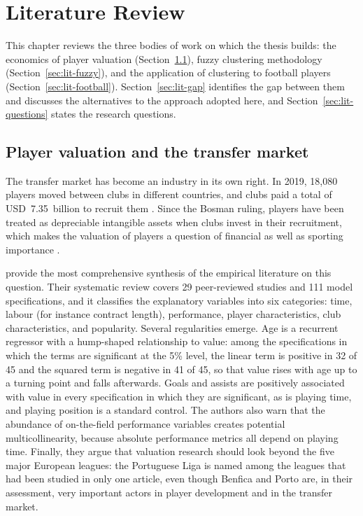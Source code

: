 \chapter{Literature Review}
\label{ch:literature}

This chapter reviews the three bodies of work on which the thesis builds: the economics of player valuation (Section~\ref{sec:lit-valuation}), fuzzy clustering methodology (Section~\ref{sec:lit-fuzzy}), and the application of clustering to football players (Section~\ref{sec:lit-football}). Section~\ref{sec:lit-gap} identifies the gap between them and discusses the alternatives to the approach adopted here, and Section~\ref{sec:lit-questions} states the research questions.

\section{Player valuation and the transfer market}
\label{sec:lit-valuation}

The transfer market has become an industry in its own right. In 2019, 18,080 players moved between clubs in different countries, and clubs paid a total of USD~7.35~billion to recruit them \cite{franceschi2024determinants}. Since the Bosman ruling, players have been treated as depreciable intangible assets when clubs invest in their recruitment, which makes the valuation of players a question of financial as well as sporting importance \cite{franceschi2024determinants}.

 provide the most comprehensive synthesis of the empirical literature on this question. Their systematic review covers 29 peer-reviewed studies and 111 model specifications, and it classifies the explanatory variables into six categories: time, labour (for instance contract length), performance, player characteristics, club characteristics, and popularity. Several regularities emerge. Age is a recurrent regressor with a hump-shaped relationship to value: among the specifications in which the terms are significant at the 5\% level, the linear term is positive in 32 of 45 and the squared term is negative in 41 of 45, so that value rises with age up to a turning point and falls afterwards. Goals and assists are positively associated with value in every specification in which they are significant, as is playing time, and playing position is a standard control. The authors also warn that the abundance of on-the-field performance variables creates potential multicollinearity, because absolute performance metrics all depend on playing time. Finally, they argue that valuation research should look beyond the five major European leagues: the Portuguese Liga is named among the leagues that had been studied in only one article, even though Benfica and Porto are, in their assessment, very important actors in player development and in the transfer market.


